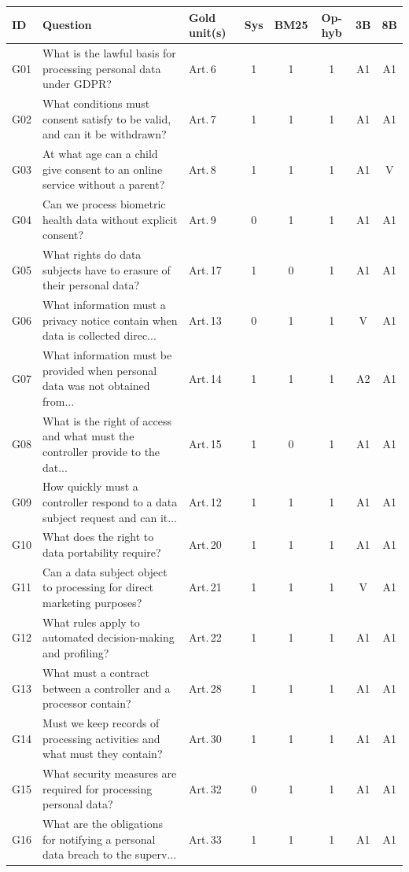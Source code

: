 \begin{tabular}{@{}llp{3.1cm}cccc c@{}}
\toprule
ID & Question & Gold unit(s) & Sys & BM25 & Op-hyb & 3B & 8B \\
\midrule
G01 & What is the lawful basis for processing personal data under GDPR? & Art.\,6 & 1 & 1 & 1 & A1 & A1 \\
G02 & What conditions must consent satisfy to be valid, and can it be withdrawn? & Art.\,7 & 1 & 1 & 1 & A1 & A1 \\
G03 & At what age can a child give consent to an online service without a parent? & Art.\,8 & 1 & 1 & 1 & A1 & V \\
G04 & Can we process biometric health data without explicit consent? & Art.\,9 & 0 & 1 & 1 & A1 & A1 \\
G05 & What rights do data subjects have to erasure of their personal data? & Art.\,17 & 1 & 0 & 1 & A1 & A1 \\
G06 & What information must a privacy notice contain when data is collected direc... & Art.\,13 & 0 & 1 & 1 & V & A1 \\
G07 & What information must be provided when personal data was not obtained from... & Art.\,14 & 1 & 1 & 1 & A2 & A1 \\
G08 & What is the right of access and what must the controller provide to the dat... & Art.\,15 & 1 & 0 & 1 & A1 & A1 \\
G09 & How quickly must a controller respond to a data subject request and can it... & Art.\,12 & 1 & 1 & 1 & A1 & A1 \\
G10 & What does the right to data portability require? & Art.\,20 & 1 & 1 & 1 & A1 & A1 \\
G11 & Can a data subject object to processing for direct marketing purposes? & Art.\,21 & 1 & 1 & 1 & V & A1 \\
G12 & What rules apply to automated decision-making and profiling? & Art.\,22 & 1 & 1 & 1 & A1 & A1 \\
G13 & What must a contract between a controller and a processor contain? & Art.\,28 & 1 & 1 & 1 & A1 & A1 \\
G14 & Must we keep records of processing activities and what must they contain? & Art.\,30 & 1 & 1 & 1 & A1 & A1 \\
G15 & What security measures are required for processing personal data? & Art.\,32 & 0 & 1 & 1 & A1 & A1 \\
G16 & What are the obligations for notifying a personal data breach to the superv... & Art.\,33 & 1 & 1 & 1 & A1 & A1 \\

\end{tabular}
